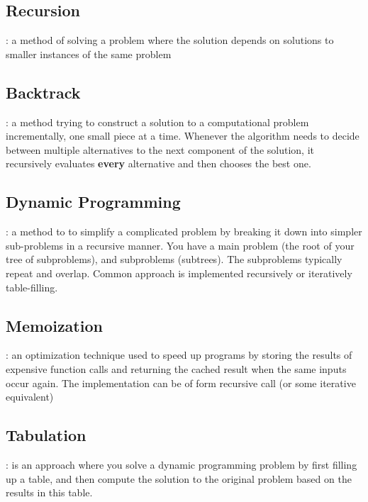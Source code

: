 \documentclass[]{book}
\begin{document}
\hypertarget{recursion}{%
\subsection{Recursion}\label{recursion}}

: a method of solving a problem where the solution depends on solutions to smaller
instances of the same problem

\hypertarget{backtrack}{%
\subsection{Backtrack}\label{backtrack}}

: a method trying to construct a solution to a computational problem incrementally,
one small piece at a time. Whenever the algorithm needs to decide between multiple alternatives to the next
component of the solution, it recursively evaluates \textbf{every} alternative and then chooses the best one.

\hypertarget{dp}{%
\subsection{Dynamic Programming}\label{dp}}

: a method to to simplify a complicated problem by breaking it down into simpler sub-problems in a
recursive manner. You have a main problem (the root of your tree of subproblems), and subproblems (subtrees). The
subproblems typically repeat and overlap. Common approach is implemented recursively or iteratively table-filling.

\hypertarget{memo}{%
\subsection{Memoization}\label{memo}}

: an optimization technique used to speed up programs by storing the results of expensive function calls and returning the cached result when the same inputs occur again. The implementation can be of form recursive call (or some iterative equivalent)

\hypertarget{table}{%
\subsection{Tabulation}\label{table}}

: is an approach where you solve a dynamic programming problem by first filling up a table, and then
compute the solution to the original problem based on the results in this table.
\end{document}
